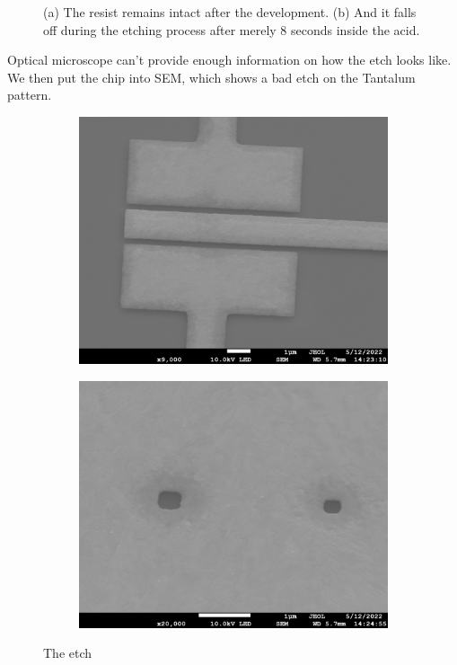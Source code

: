 \begin{figure}[h!]
\begin{subfigure}[b]{0.5\textwidth}
         \caption{}
         \label{}
     \end{subfigure}
    \caption{(a) The resist remains intact after the development. (b) And it falls off during the etching process after merely 8 seconds inside the acid.}
    \label{TaNWonchip2}
\end{figure}

Optical microscope can't provide enough information on how the etch looks like. We then put the chip into SEM, which shows a bad etch on the Tantalum pattern.
\clearpage
\begin{figure}[h!]
    \centering
    \begin{subfigure}[b]{0.6\textwidth}
         \centering
         \includegraphics[width=1\textwidth]{Pic/Csar_SEM.jpg}
         \caption{}
         \label{}
     \end{subfigure}
     \hfill
     \begin{subfigure}[b]{0.6\textwidth}
         \centering
         \includegraphics[width=\textwidth]{Pic/Csar_SEM_0.jpg}
         \caption{}
         \label{}
     \end{subfigure}
    \caption{The etch}
    \label{TaNWonchip2}
\end{figure}

